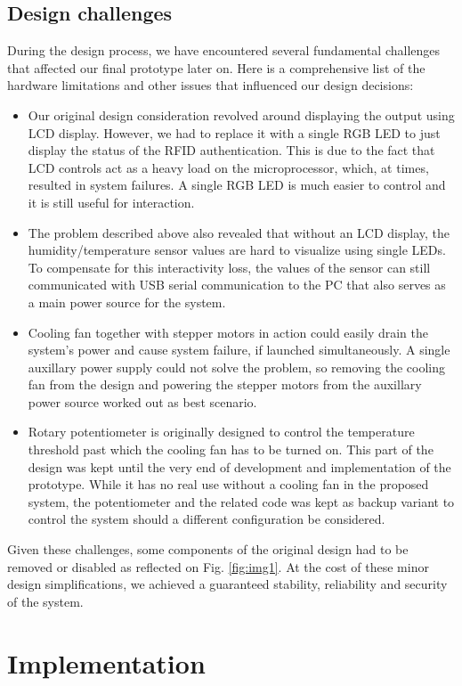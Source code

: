 \documentclass[journal,onecolumn]{IEEEtran}
\begin{document}
\subsection{Design challenges}
During the design process, we have encountered several fundamental challenges that affected our final prototype later on. Here is a comprehensive list of the hardware limitations and other issues that influenced our design decisions:
\begin{itemize}
	\item{Our original design consideration revolved around displaying the output using LCD display. However, we had to replace it with a single RGB LED to just display the status of the RFID authentication. This is due to the fact that LCD controls act as a heavy load on the microprocessor, which, at times, resulted in system failures. A single RGB LED is much easier to control and it is still useful for interaction.}
	\item{The problem described above also revealed that without an LCD display, the humidity/temperature sensor values are hard to visualize using single LEDs. To compensate for this interactivity loss, the values of the sensor can still communicated with USB serial communication to the PC that also serves as a main power source for the system.}
	\item{Cooling fan together with stepper motors in action could easily drain the system's power and cause system failure, if launched simultaneously. A single auxillary power supply could not solve the problem, so removing the cooling fan from the design and powering the stepper motors from the auxillary power source worked out as best scenario.}
	\item{Rotary potentiometer is originally designed to control the temperature threshold past which the cooling fan has to be turned on. This part of the design was kept until the very end of development and implementation of the prototype. While it has no real use without a cooling fan in the proposed system, the potentiometer and the related code was kept as backup variant to control the system should a different configuration be considered.}
\end{itemize}

Given these challenges, some components of the original design had to be removed or disabled as reflected on Fig. \ref{fig:img1}. At the cost of these minor design simplifications, we achieved a guaranteed stability, reliability and security of the system. 

\section{Implementation}
\end{document}
